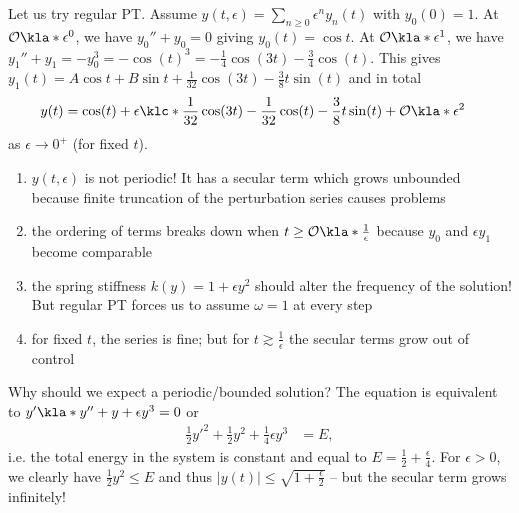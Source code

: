\documentclass[english, parskip=full]{scrbook}
\newcommand{\note}[1]{\begin{tcolorbox}[colback=colorbackgroundnote,colframe=colornote, breakable,enhanced]#1\end{tcolorbox}}
\begin{document}
Let us try regular PT.
Assume $y(t,\epsilon) = \sum_{n\ge 0} \epsilon^n y_n(t)$ with $y_0(0)=1$.
At $\mathcal{O}\kla*{\epsilon^0}$, we have $y_0''+y_0=0$ giving $y_0(t)=\cos t$.
At $\mathcal{O}\kla*{\epsilon^1}$, we have $y_1'' + y_1 = -y_0^3 = -\cos(t)^3 = -\frac{1}{4} \cos (3t) - \frac{3}{4} \cos(t)$.
This gives $y_1(t) = A\cos t + B\sin t + \frac{1}{32}\cos(3t) - \frac{3}{8} t\sin(t)$ and in total
\begin{align}
y(t) &= \cos (t) + \epsilon \klc*{\frac{1}{32}\cos(3t) - \frac{1}{32}\cos(t) - \frac{3}{8}t\sin(t)} + \mathcal{O}\kla*{\epsilon^2}
\end{align}
as $\epsilon\rightarrow 0^+$ (for fixed $t$).
\note{
\begin{enumerate}
\item $y(t,\epsilon)$ is not periodic! It has a secular term which grows unbounded because finite truncation of the perturbation series causes problems
\item the ordering of terms breaks down when $t\ge \mathcal{O}\kla*{\frac{1}{\epsilon}}$ because $y_0$ and $\epsilon y_1$ become comparable
\item the spring stiffness $k(y)=1+\epsilon y^2$ should alter the frequency of the solution! But regular PT forces us to assume $\omega=1$ at every step
\item for fixed $t$, the series is fine; but for $t\gtrsim \frac{1}{\epsilon}$ the secular terms grow out of control
\end{enumerate}
}
Why should we expect a periodic/bounded solution?
The equation is equivalent to $y' \kla*{y'' + y+\epsilon y^3} = 0$ or
\begin{align}
\frac{1}{2} y'^2 + \frac{1}{2}y^2 + \frac{1}{4}\epsilon y^3 &= E,
\end{align}
i.e. the total energy in the system is constant and equal to $E=\frac{1}{2}+\frac{\epsilon}{4}$.
For $\epsilon > 0$, we clearly have $\frac{1}{2} y^2 \le E$ and thus $|y(t)| \le \sqrt{1 + \frac{\epsilon}{2}}$ -- but the secular term grows infinitely!
\end{document}
